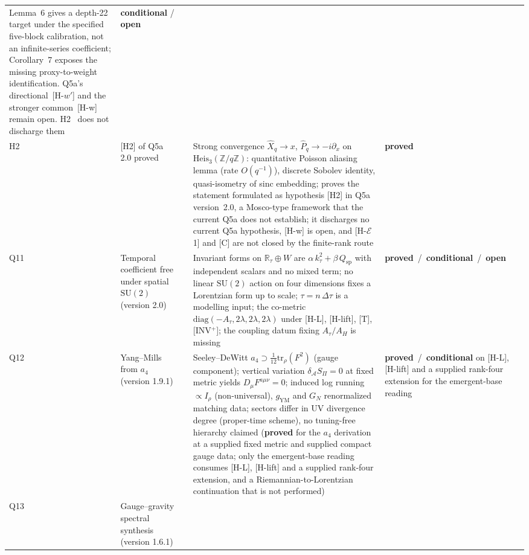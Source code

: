 \documentclass[11pt,a4paper]{article}
\newcommand{\Heis}{\mathrm{Heis}}
\newcommand{\SU}{\mathrm{SU}}
\newcommand{\sproved}{\textcolor{cproved}{\textbf{proved}}}
\newcommand{\sopen}{\textcolor{copen}{\textbf{open}}}
\newcommand{\scond}{\textcolor{ccond}{\textbf{conditional}}}
\begin{document}
\begin{longtable}{@{}p{1.70cm}p{2.9cm}p{1.3cm}p{6.25cm}>{\raggedright\arraybackslash}p{2.0cm}@{}}
      Lemma~6 gives a depth-22 target under the specified five-block calibration,
      not an infinite-series coefficient; Corollary~7 exposes the missing
      proxy-to-weight identification.
      Q5a's directional~[H-$w'$] and the stronger common~[H-w] remain open.
      H2~\cite{Beau2026h2} does not discharge them &
      \scond{} / \sopen \\[3pt]
      H2 & [H2] of Q5a 2.0 proved & \cite{Beau2026h2} &
      Strong convergence $\hat{X}_q \to x$, $\hat{P}_q \to -i\partial_x$ on
      $\Heis_3(\mathbb{Z}/q\mathbb{Z})$: quantitative Poisson aliasing lemma (rate $O(q^{-1})$),
      discrete Sobolev identity, quasi-isometry of sinc embedding;
      proves the statement formulated as hypothesis [H2] in Q5a version~2.0, a Mosco-type
      framework that the current Q5a does not establish; it discharges no current Q5a hypothesis,
      [H-w] is open, and [H-$\mathcal{E}$1] and [C] are not closed by the finite-rank route &
      \sproved \\[3pt]
      Q11 & Temporal coefficient free under spatial $\SU(2)$ (version 2.0) & \cite{Beau2026q11} &
      Invariant forms on $\mathbb{R}_\tau\oplus W$ are $\alpha\,k_\tau^2+\beta\,Q_{\mathrm{sp}}$ with independent
      scalars and no mixed term; no linear $\SU(2)$ action on four dimensions fixes a Lorentzian form up to scale;
      $\tau = n\,\Delta\tau$ is a modelling input; the co-metric $\mathrm{diag}(-A_\tau,2\lambda,2\lambda,2\lambda)$
      under [H-L], [H-lift], [T], [INV$^+$]; the coupling datum fixing $A_\tau/A_H$ is missing &
      \sproved\ /\ \scond\ /\ \sopen \\[3pt]
      Q12 & Yang--Mills from $a_4$ (version 1.9.1) & \cite{Beau2026q12} &
      Seeley--DeWitt $a_4 \supset \tfrac{1}{12}\mathrm{tr}_\rho(F^2)$ (gauge component);
      vertical variation $\delta_\mathcal{A} S_\Pi = 0$ at fixed metric yields
      $D_\mu F^{a\mu\nu} = 0$; induced log running $\propto I_\rho$ (non-universal),
      $g_{\mathrm{YM}}$ and $G_N$ renormalized matching data; sectors differ in UV
      divergence degree (proper-time scheme), no tuning-free hierarchy claimed
      (\sproved{} for the $a_4$ derivation at a supplied fixed metric and supplied compact gauge
      data; only the emergent-base reading consumes [H-L], [H-lift] and a supplied rank-four extension,
      and a Riemannian-to-Lorentzian continuation that is not performed) &
      \sproved\ /\ \scond{} on [H-L], [H-lift] and a supplied rank-four extension for the emergent-base reading \\[3pt]
      Q13 & Gauge--gravity spectral synthesis (version 1.6.1) & \cite{Beau2026q13} &

\end{longtable}
\end{document}

